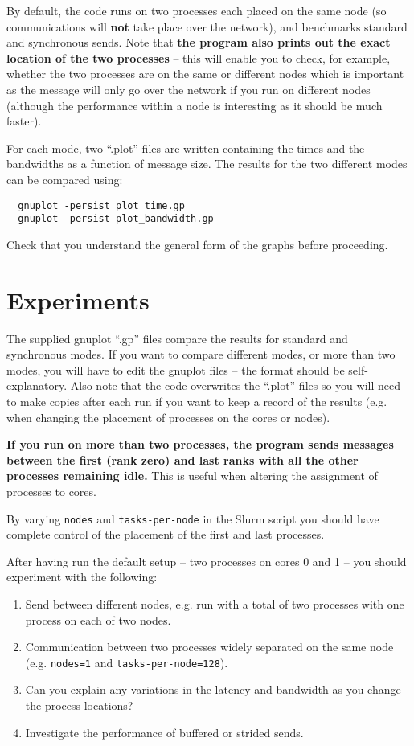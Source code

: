 \documentclass{article}
\begin{document}
By default, the code runs on two processes each placed on the same
node (so communications will {\bf not} take place over the
network), and benchmarks standard and synchronous sends. Note that
{\bf the program also prints out the exact location of the two
  processes} -- this will enable you to check, for example, whether the two processes
are on the same or different nodes which is important as the message will only
go over the network if you run on different nodes (although the performance
within a node is interesting as it should be much faster).

For each mode, two ``.plot'' files are written containing the times and
the bandwidths as a function of message size. The results for the two
different modes can be compared using:

\begin{verbatim}
  gnuplot -persist plot_time.gp
  gnuplot -persist plot_bandwidth.gp
\end{verbatim}

Check that you understand the general form of the graphs before
proceeding.

\section{Experiments}

The supplied gnuplot ``.gp'' files compare the results for standard and
synchronous modes. If you want to compare different modes, or more than
two modes, you will have to edit the gnuplot files -- the format should
be self-explanatory. Also note that the code overwrites the ``.plot''
files so you will need to make copies after each run if you want to keep
a record of the results (e.g. when changing the placement of processes
on the cores or nodes).

{\bf If you run on more than two processes, the program sends messages
  between the first (rank zero) and last ranks with all the other
  processes remaining idle.} This is useful when altering the
assignment of processes to cores.

By varying \verb+nodes+ and \verb+tasks-per-node+ in the Slurm script
you should have complete control of the placement of the first and
last processes.

After having run the default setup -- two processes on cores 0 and 1
-- you should experiment with the following:

\begin{enumerate}

\item Send between different nodes, e.g. run with a total of two
  processes with one process on each of two nodes.

\item Communication between two processes widely separated on the same
  node (e.g.  \verb+nodes=1+ and \verb+tasks-per-node=128+).

\item Can you explain any variations in the latency and bandwidth
  as you change the process locations?

\item Investigate the performance of buffered or strided sends.

\end{enumerate}
\end{document}
